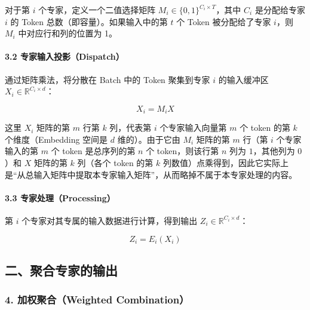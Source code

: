 对于第 \(i\) 个专家，定义一个二值选择矩阵 \(M_i \in \{0,1\}^{C_i \times T}\)，其中 \(C_i\) 是分配给专家 \(i\) 的 Token 总数（即容量）。如果输入中的第 \(t\) 个 Token 被分配给了专家 \(i\)，则 \(M_i\) 中对应行和列的位置为 1。

\hypertarget{ux4e13ux5bb6ux8f93ux5165ux6295ux5f71dispatch}{%
\paragraph{3.2 专家输入投影（Dispatch）}\label{ux4e13ux5bb6ux8f93ux5165ux6295ux5f71dispatch}}

通过矩阵乘法，将分散在 Batch 中的 Token 聚集到专家 \(i\) 的输入缓冲区 \(X_i \in \mathbb{R}^{C_i \times d}\)：

\[
X_i = M_iX
\]

这里 \(X_i\) 矩阵的第 \(m\) 行第 \(k\) 列，代表第 \(i\) 个专家输入向量第 \(m\) 个 token 的第 \(k\) 个维度（Embedding 空间是 \(d\) 维的）。由于它由 \(M_i\) 矩阵的第 \(m\) 行（第 \(i\) 个专家输入的第 \(m\) 个 token 是总序列的第 \(n\) 个 token，则该行第 \(n\) 列为 \(1\)，其他列为 \(0\)）和 \(X\) 矩阵的第 \(k\) 列（各个 token 的第 \(k\) 列数值）点乘得到，因此它实际上是``从总输入矩阵中提取本专家输入矩阵''，从而略掉不属于本专家处理的内容。

\hypertarget{ux4e13ux5bb6ux5904ux7406processing}{%
\paragraph{3.3 专家处理（Processing）}\label{ux4e13ux5bb6ux5904ux7406processing}}

第 \(i\) 个专家对其专属的输入数据进行计算，得到输出 \(Z_i \in \mathbb{R}^{C_i \times d}\)：

\[
Z_i = E_i(X_i)
\]

\hypertarget{ux4e8cux805aux5408ux4e13ux5bb6ux7684ux8f93ux51fa}{%
\subsection{二、聚合专家的输出}\label{ux4e8cux805aux5408ux4e13ux5bb6ux7684ux8f93ux51fa}}

\hypertarget{ux52a0ux6743ux805aux5408weighted-combination}{%
\subsubsection{4. 加权聚合（Weighted Combination）}\label{ux52a0ux6743ux805aux5408weighted-combination}}

